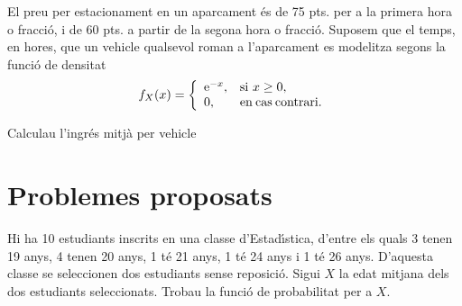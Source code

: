 \begin{probres}
{El preu per estacionament en un aparcament \'es de 75 pts. per a la primera
hora o fracci\'o, i de 60 pts. a partir de la segona hora o fracci\'o. Suposem
que el temps, en hores, que un vehicle qualsevol roman a l'aparcament es
modelitza segons la funci\'o de densitat
$$
f_X(x) = \left\{ \begin{array}{ll} {\rm e}^{-x}, & {\rm si } \ x\geq 0,\\ 
0, & {\rm en \> cas \> contrari}.
\end{array} \right.
$$

Calculau l'ingr\'es mitj\`a per vehicle}
\end{probres}


\section{Problemes proposats}

\begin{prob}
{Hi ha 10 estudiants inscrits en una classe
d'Estad\'{\i}stica, d'entre els quals 3 tenen 19 anys, 4 tenen 20 anys, 1 t\'e
21 anys, 1 t\'e 24 anys i 1 t\'e 26 anys. D'aquesta classe se seleccionen dos
estudiants sense reposici\'o. Sigui $X$ la edat mitjana dels dos estudiants
seleccionats. Trobau la funci\'o de probabilitat per a $X$.} 
\end{prob}

